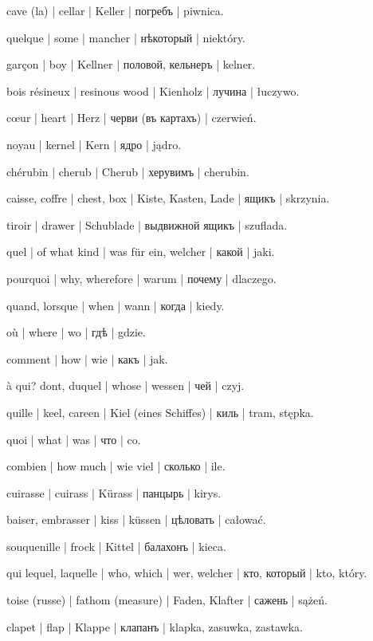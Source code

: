 \begin{outdent}{1em}
cave (la) | cellar | Keller | погребъ | piwnica.

quelque | some | mancher | нѣкоторый | niektóry.

garçon | boy | Kellner | половой, кельнеръ | kelner.

bois résineux | resinous wood | Kienholz | лучина | łuczywo.

cœur | heart | Herz | черви (въ картахъ) | czerwień.

noyau | kernel | Kern | ядро | jądro.

chérubin | cherub | Cherub | херувимъ | cherubin.

caisse, coffre | chest, box | Kiste, Kasten, Lade | ящикъ | skrzynia.

\uvsubentry{}
tiroir | drawer | Schublade | выдвижной ящикъ | szuflada.

quel | of what kind | was für ein, welcher | какой | jaki.

pourquoi | why, wherefore | warum | почему | dlaczego.

quand, lorsque | when | wann | когда | kiedy.

où | where | wo | гдѣ | gdzie.

comment | how | wie | какъ | jak.

à qui? dont, duquel | whose | wessen | чей | czyj.

quille | keel, careen | Kiel (eines Schiffes) | киль | tram,
stępka.

quoi | what | was | что | co.

combien | how much | wie viel | сколько | ile.

cuirasse | cuirass | Kürass | панцырь | kirys.

baiser, embrasser | kiss | küssen | цѣловать | całować.

souquenille | frock | Kittel | балахонъ | kieca.

qui lequel, laquelle | who, which | wer, welcher | кто, который | kto, który.

toise (russe) | fathom (measure) | Faden, Klafter | сажень | sążeń.

clapet | flap | Klappe | клапанъ | klapka, zasuwka, zastawka.


\end{outdent}
